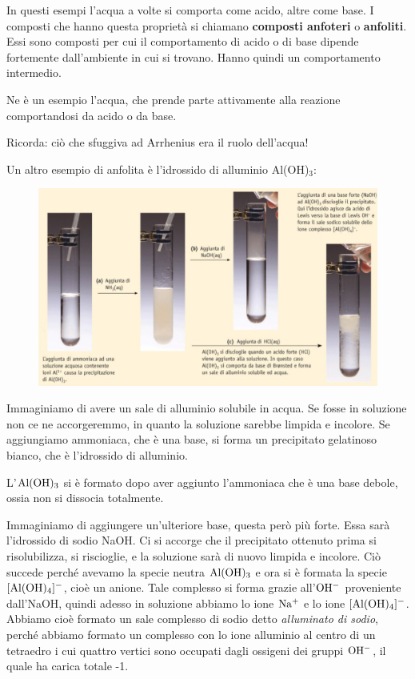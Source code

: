 \vspace{0.2cm}In questi esempi l'acqua a volte si comporta come acido, altre come base. I composti che hanno questa proprietà si chiamano \textbf{composti anfoteri} o \textbf{anfoliti}. Essi sono composti per cui il comportamento di acido o di base dipende fortemente dall'ambiente in cui si trovano. Hanno quindi un comportamento intermedio.

Ne è un esempio l'acqua, che prende parte attivamente alla reazione comportandosi da acido o da base.

\vspace{0.2cm}Ricorda: ciò che sfuggiva ad Arrhenius era il ruolo dell'acqua!

\vspace{0.2cm}Un altro esempio di anfolita è l'idrossido di alluminio Al(OH)$_3$:

\begin{figure}[htp]
    \centering
    \includegraphics[width=12cm]{immagini/anfoliti.png}
\end{figure}

Immaginiamo di avere un sale di alluminio solubile in acqua. Se fosse in soluzione non ce ne accorgeremmo, in quanto la soluzione sarebbe limpida e incolore. Se aggiungiamo ammoniaca, che è una base, si forma un precipitato gelatinoso bianco, che è l'idrossido di alluminio.

L'$\rm Al(OH)_3$ si è formato dopo aver aggiunto l'ammoniaca che è una base debole, ossia non si dissocia totalmente.

Immaginiamo di aggiungere un'ulteriore base, questa però più forte. Essa sarà l'idrossido di sodio NaOH. Ci si accorge che il precipitato ottenuto prima si risolubilizza, si riscioglie, e la soluzione sarà di nuovo limpida e incolore. Ciò succede perché avevamo la specie neutra $\rm Al(OH)_3$ e ora si è formata la specie $\rm [Al(OH)_4]^-$, cioè un anione. Tale complesso si forma grazie all'$\rm OH^-$ proveniente dall'NaOH, quindi adesso in soluzione abbiamo lo ione $\rm Na^+$ e lo ione $\rm [Al(OH)_4]^-$. Abbiamo cioè formato un sale complesso di sodio detto \textit{alluminato di sodio}, perché abbiamo formato un complesso con lo ione alluminio al centro di un tetraedro i cui quattro vertici sono occupati dagli ossigeni dei gruppi $\rm OH^-$, il quale ha carica totale -1.

